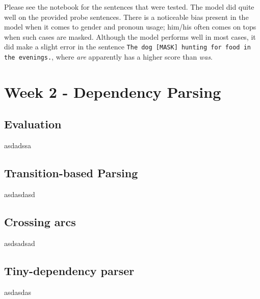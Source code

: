 \documentclass[a4paper, 11pt]{article}
\begin{document}
Please see the notebook for the sentences that were tested. The model did quite well on the provided probe sentences. There is a noticeable bias present in the model when it comes to gender and pronoun usage; him/his often comes on tops when such cases are masked. Although the model performs well in most cases, it did make a slight error in the sentence \texttt{The dog [MASK] hunting for food in the evenings.}, where \textit{are} apparently has a higher score than \textit{was}. 

\section{Week 2 - Dependency Parsing}

\subsection{Evaluation}

asdadssa

\subsection{Transition-based Parsing}

asdasdasd

\subsection{Crossing arcs}

asdsadsad

\subsection{Tiny-dependency parser}

asdasdas
\end{document}
